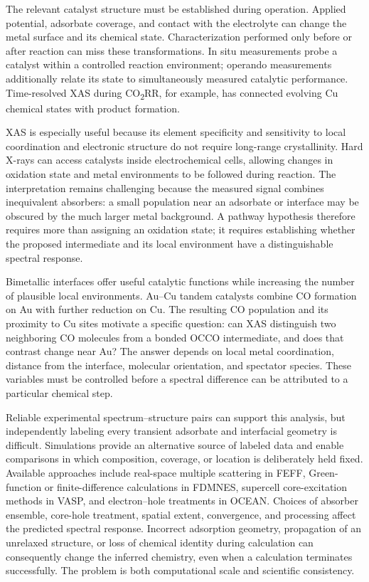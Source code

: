 \documentclass[11pt,a4paper]{article}
\begin{document}
The relevant catalyst structure must be established during operation. Applied potential, adsorbate coverage, and contact with the electrolyte can change the metal surface and its chemical state. Characterization performed only before or after reaction can miss these transformations. In situ measurements probe a catalyst within a controlled reaction environment; operando measurements additionally relate its state to simultaneously measured catalytic performance.\cite{operando2021} Time-resolved XAS during CO\textsubscript{2}RR, for example, has connected evolving Cu chemical states with product formation.\cite{lin2020}

XAS is especially useful because its element specificity and sensitivity to local coordination and electronic structure do not require long-range crystallinity. Hard X-rays can access catalysts inside electrochemical cells, allowing changes in oxidation state and metal environments to be followed during reaction.\cite{operando2021,lin2020} The interpretation remains challenging because the measured signal combines inequivalent absorbers: a small population near an adsorbate or interface may be obscured by the much larger metal background. A pathway hypothesis therefore requires more than assigning an oxidation state; it requires establishing whether the proposed intermediate and its local environment have a distinguishable spectral response.

Bimetallic interfaces offer useful catalytic functions while increasing the number of plausible local environments. Au--Cu tandem catalysts combine CO formation on Au with further reduction on Cu.\cite{morales2018} The resulting CO population and its proximity to Cu sites motivate a specific question: can XAS distinguish two neighboring CO molecules from a bonded OCCO intermediate, and does that contrast change near Au? The answer depends on local metal coordination, distance from the interface, molecular orientation, and spectator species. These variables must be controlled before a spectral difference can be attributed to a particular chemical step.

Reliable experimental spectrum--structure pairs can support this analysis, but independently labeling every transient adsorbate and interfacial geometry is difficult. Simulations provide an alternative source of labeled data and enable comparisons in which composition, coverage, or location is deliberately held fixed. Available approaches include real-space multiple scattering in FEFF, Green-function or finite-difference calculations in FDMNES, supercell core-excitation methods in VASP, and electron--hole treatments in OCEAN.\cite{rehr2010,joly2001,vasp1996,vaspxas,ocean2011} Choices of absorber ensemble, core-hole treatment, spatial extent, convergence, and processing affect the predicted spectral response. Incorrect adsorption geometry, propagation of an unrelaxed structure, or loss of chemical identity during calculation can consequently change the inferred chemistry, even when a calculation terminates successfully. The problem is both computational scale and scientific consistency.
\end{document}
